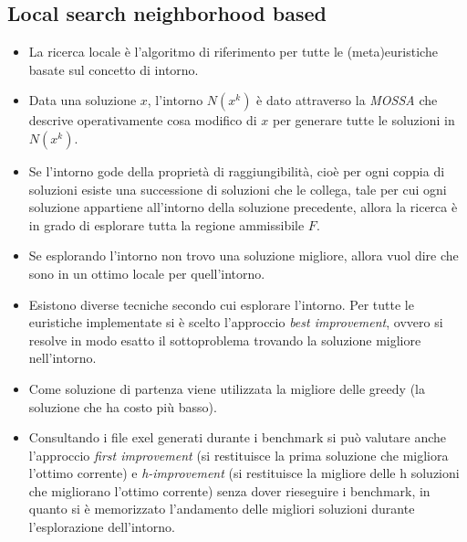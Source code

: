 \documentclass[9pt]{beamer}
\begin{document}
\subsection{Local search neighborhood based}
\begin{frame}[allowframebreaks]{\subsecname}

	\begin{itemize}
		\item
		La ricerca locale è l’algoritmo di riferimento per tutte le (meta)euristiche basate sul concetto di intorno.
		
		\item	
		Data una soluzione $x$, l’intorno $N(x^k)$ è dato attraverso la \emph{MOSSA} che descrive operativamente cosa modifico di $x$ per generare tutte le soluzioni in $N(x^k)$.

		\item
		Se l’intorno gode della proprietà di raggiungibilità, cioè per ogni coppia di soluzioni esiste una successione di soluzioni che le collega, tale per cui ogni soluzione appartiene all’intorno della soluzione precedente, allora la ricerca è in grado di esplorare tutta la regione ammissibile $F$.

		\item
		Se esplorando l’intorno non trovo una soluzione migliore, allora vuol dire che sono in un ottimo locale per quell’intorno.
	\end{itemize}

\framebreak

	\begin{itemize}
		\item
		Esistono diverse tecniche secondo cui esplorare l’intorno. Per tutte le euristiche implementate si è scelto l’approccio \emph{best improvement}, ovvero si resolve in modo esatto il sottoproblema trovando la soluzione migliore nell’intorno.

		\item
		Come soluzione di partenza viene utilizzata la migliore delle greedy (la soluzione che ha costo più basso).

		\item
		Consultando i file exel generati durante i benchmark si può valutare anche l’approccio \emph{first improvement} (si restituisce la prima soluzione che migliora l’ottimo corrente) e \emph{h-improvement} (si restituisce la migliore delle h soluzioni che migliorano l’ottimo corrente) senza dover rieseguire i benchmark, in quanto si è memorizzato l’andamento delle migliori soluzioni durante l’esplorazione dell’intorno.
	\end{itemize}

\end{frame}
\end{document}
